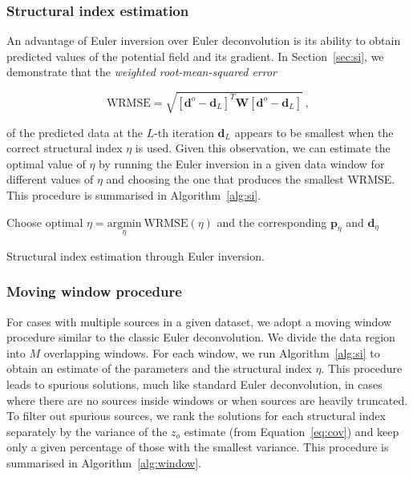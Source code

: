 \subsubsection{Structural index estimation}

An advantage of Euler inversion over Euler deconvolution is its ability to obtain
predicted values of the potential field and its gradient.
In Section~\ref{sec:si}, we demonstrate that the \textit{weighted root-mean-squared error}

\begin{equation}
    \text{WRMSE} = \sqrt{\left[\mathbf{d}^o - \mathbf{d}_L\right]^T\mathbf{W}\left[\mathbf{d}^o - \mathbf{d}_L\right]} \ ,
    \label{eq:wrmse}
\end{equation}

\noindent
of the predicted data at the $L$-th iteration $\mathbf{d}_L$
appears to be smallest when the correct structural index $\eta$ is used.
Given this observation, we can estimate the optimal value of $\eta$ by running
the Euler inversion in a given data window for different values of $\eta$ and
choosing the one that produces the smallest WRMSE.
This procedure is summarised in Algorithm~\ref{alg:si}.

\begin{algorithm}[!htb]
  Choose optimal $\eta = \underset{\eta}{\text{argmin}}\ \text{WRMSE}(\eta)$ and the corresponding
  $\mathbf{p}_{\eta}$ and $\mathbf{d}_{\eta}$
  \;
  \BlankLine
  \caption{Structural index estimation through Euler inversion.}
  \label{alg:si}
\end{algorithm}

\subsubsection{Moving window procedure}

For cases with multiple sources in a given dataset, we adopt a moving window
procedure similar to the classic Euler deconvolution.
We divide the data region into $M$ overlapping windows.
For each window, we run Algorithm~\ref{alg:si} to obtain an estimate of the
parameters and the structural index $\eta$.
This procedure leads to spurious solutions, much like standard Euler
deconvolution, in cases where there are no sources inside windows or when
sources are heavily truncated.
To filter out spurious sources, we rank the solutions for each structural index
separately by the variance of the $z_o$ estimate (from Equation~\ref{eq:cov})
and keep only a given percentage of those with the smallest variance.
This procedure is summarised in Algorithm~\ref{alg:window}.

